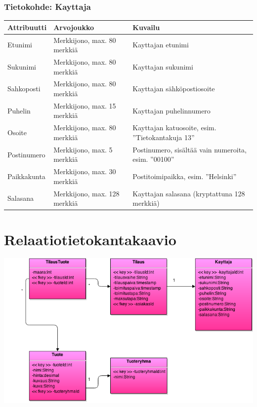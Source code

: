 \documentclass[a4paper,12pt, titlepage]{article}
\begin{document}
\subsubsection*{Tietokohde: Kayttaja}
\begin{table}[H]
\begin{tabularx}{\textwidth}{|p{2.5cm}|p{3.5cm}|X|}
\hline
\bf{Attribuutti} & \textbf{Arvojoukko}	& \textbf{Kuvailu}  \\ \hline
Etunimi              & Merkkijono, max. 80 merkkiä  & Kayttajan etunimi                                   \\ \hline
Sukunimi             & Merkkijono, max. 80 merkkiä  & Kayttajan sukunimi                                  \\ \hline
Sahkoposti           & Merkkijono, max. 80 merkkiä  & Kayttajan sähköpostiosoite                          \\ \hline
Puhelin              & Merkkijono, max. 15 merkkiä  & Kayttajan puhelinnumero                             \\ \hline
Osoite               & Merkkijono, max. 80 merkkiä  & Kayttajan katuosoite, esim. ”Tietokantakuja 13”     \\ \hline
Postinumero          & Merkkijono, max. 5 merkkiä   & Postinumero, sisältää vain numeroita, esim. ”00100” \\ \hline
Paikkakunta          & Merkkijono, max. 30 merkkiä  & Postitoimipaikka, esim. ”Helsinki”                  \\ \hline
Salasana             & Merkkijono, max. 128 merkkiä & Kayttajan salasana (kryptattuna 128 merkkiä)        \\ \hline
\end{tabularx}
\end{table}

\newpage
\section{Relaatiotietokantakaavio}
\hfill

\noindent
\includegraphics[keepaspectratio, width=\textwidth]{kaaviot/relaatiotietokantakaavio.png}
\end{document}
